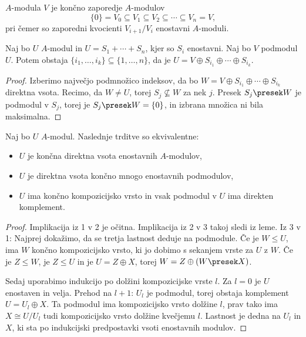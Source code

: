 \begin{definicija}
   $A$-modula $V$ je končno zaporedje $A$-modulov
  \[
	\{0\} = V_0 \subseteq V_1 \subseteq V_2 \subseteq \cdots \subseteq V_n = V,
  \]
  pri čemer so zaporedni kvocienti $V_{i+1} / V_i$ enostavni $A$-moduli.
\end{definicija}

\begin{lema}
  Naj bo $U$ $A$-modul in $U = S_1 + \cdots + S_n$, kjer so $S_i$ enostavni.
  Naj bo $V$ podmodul $U$.
  Potem obstaja $\{i_1, \ldots, i_k\} \subseteq \{1, \ldots, n\}$, da je $U = V
  \oplus S_{i_1} \oplus \cdots \oplus S_{i_k}$.
\end{lema}

\begin{proof}
  Izberimo največjo podmnožico indeksov, da bo $W = V \oplus S_{i_1} \oplus
  \cdots \oplus S_{i_k}$ direktna vsota.
  Recimo, da $W \ne U$, torej $S_j \nsubseteq W$ za nek $j$.
  Presek $S_j \presek W$ je podmodul v $S_j$, torej je $S_j \presek W = \{0\}$,
  in izbrana množica ni bila maksimalna.
\end{proof}


\begin{trditev}
  Naj bo $U$ $A$-modul.
  Naslednje trditve so ekvivalentne:
  \begin{itemize}
  \item $U$ je končna direktna vsota enostavnih $A$-modulov,
  \item $U$ je direktna vsota končno mnogo enostavnih podmodulov,
  \item $U$ ima končno kompozicijsko vrsto in vsak podmodul v $U$ ima direkten
	komplement.
  \end{itemize}
\end{trditev}

\begin{proof}
  Implikacija iz 1 v 2 je očitna.
  Implikacija iz 2 v 3 takoj sledi iz leme.
  Iz 3 v 1:
  Najprej dokažimo, da se tretja lastnost deduje na podmodule.
  Če je $W \le U$, ima $W$ končno kompozicijsko vrsto, ki jo dobimo s sekanjem
  vrste za $U$ z $W$.
  Če je $Z \le W$, je $Z \le U$ in je $U = Z \oplus X$, torej $W = Z \oplus (W
  \presek X)$.

  Sedaj uporabimo indukcijo po dolžini kompozicijske vrste $l$.
  Za $l = 0$ je $U$ enostaven in velja.
  Prehod na $l+1$: $U_l$ je podmodul, torej obstaja komplement $U = U_l \oplus
  X$.
  Ta podmodul ima kompozicijsko vrsto dolžine $l$, prav tako ima $X \cong U/U_l$
  tudi kompozicijsko vrsto dolžine kvečjemu $l$.
  Lastnost je dedna na $U_l$ in $X$, ki sta po indukcijski predpostavki vsoti
  enostavnih modulov.
\end{proof}

